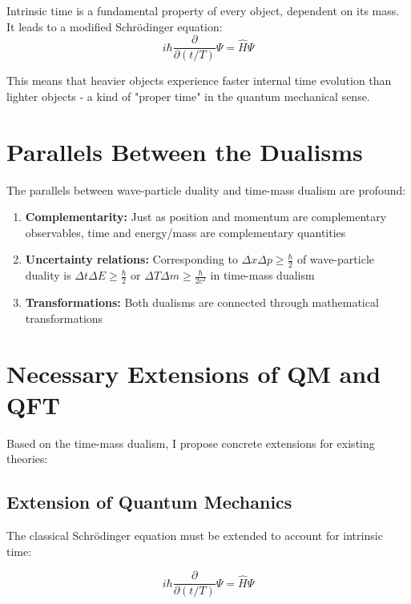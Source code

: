 \documentclass[a4paper,12pt]{article}
\begin{document}
	Intrinsic time is a fundamental property of every object, dependent on its mass. It leads to a modified Schrödinger equation:
	\begin{equation}
		i\hbar \frac{\partial}{\partial (t/T)} \Psi = \hat{H} \Psi
	\end{equation}
	
	This means that heavier objects experience faster internal time evolution than lighter objects - a kind of "proper time" in the quantum mechanical sense.
	
	\section{Parallels Between the Dualisms}
	
	The parallels between wave-particle duality and time-mass dualism are profound:
	
	\begin{enumerate}
		\item \textbf{Complementarity:} Just as position and momentum are complementary observables, time and energy/mass are complementary quantities
		
		\item \textbf{Uncertainty relations:} Corresponding to $\Delta x \Delta p \geq \frac{\hbar}{2}$ of wave-particle duality is $\Delta t \Delta E \geq \frac{\hbar}{2}$ or $\Delta T \Delta m \geq \frac{\hbar}{2c^2}$ in time-mass dualism
		
		\item \textbf{Transformations:} Both dualisms are connected through mathematical transformations
	\end{enumerate}
	
	\section{Necessary Extensions of QM and QFT}
	
	Based on the time-mass dualism, I propose concrete extensions for existing theories:
	
	\subsection{Extension of Quantum Mechanics}
	
	The classical Schrödinger equation must be extended to account for intrinsic time:
	
	\begin{equation}
		i\hbar \frac{\partial}{\partial (t/T)} \Psi = \hat{H} \Psi
	\end{equation}
	
\end{document}
